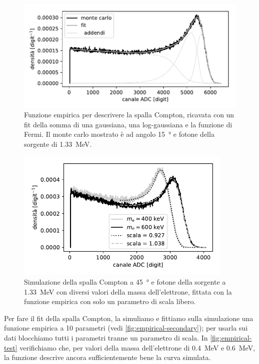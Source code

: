 \begin{figure}
	\centering
	\includegraphics[width=33em]{empirical-secondary}
	\caption{\label{fig:empirical-secondary}
	Funzione empirica per descrivere la spalla Compton,
	ricavata con un fit della somma di una gaussiana, una log-gaussiana e la funzione di Fermi.
	Il monte carlo mostrato è ad angolo \SI{15}{\degree} e fotone della sorgente di \SI{1.33}{MeV}.}
\end{figure}

\begin{figure}
	\centering
	\includegraphics[width=28em]{empirical-test}
	\caption{\label{fig:empirical-test}
	Simulazione della spalla Compton a \SI{45}{\degree} e fotone della sorgente a \SI{1.33}{MeV}
	con diversi valori della massa dell'elettrone,
	fittata con la funzione empirica con solo un parametro di scala libero.}
\end{figure}

Per fare il fit della spalla Compton,
la simuliamo e fittiamo sulla simulazione una funzione empirica a 10 parametri
(vedi \autoref{fig:empirical-secondary});
per usarla sui dati blocchiamo tutti i parametri tranne un parametro di scala.
In \autoref{fig:empirical-test} verifichiamo che,
per valori della massa dell'elettrone di \SI{0.4}{MeV} e \SI{0.6}{MeV},
la funzione descrive ancora sufficientemente bene la curva simulata.
